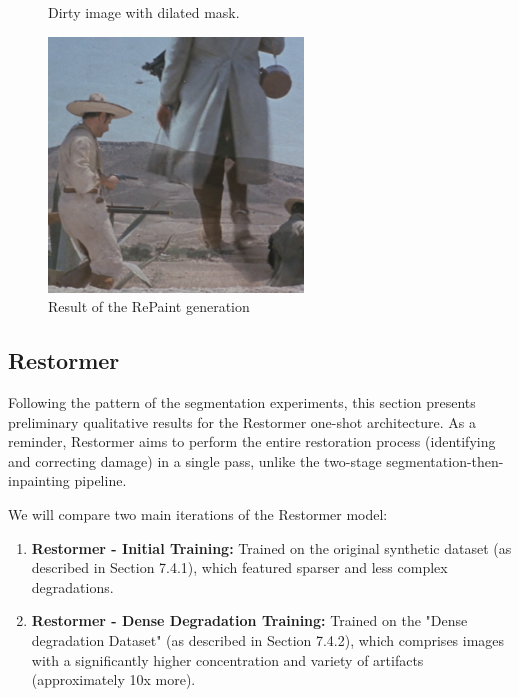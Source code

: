 \documentclass[openany, 12pt]{article}
\begin{document}
{\begin{figure}[htbp]
\begin{minipage}{0.45\textwidth}
		\caption{\smaller Dirty image with dilated mask.}
	\end{minipage}
	\hspace{0.05\textwidth}
	\begin{minipage}{0.45\textwidth}
		\centering
		\includegraphics[width=\textwidth]{images/inpainted_4.png}
		\caption{Result of the RePaint generation}
	\end{minipage}
\end{figure}
}
\subsection{Restormer}
Following the pattern of the segmentation experiments, this section presents preliminary qualitative results for the Restormer one-shot architecture. As a reminder, Restormer aims to perform the entire restoration process (identifying and correcting damage) in a single pass, unlike the two-stage segmentation-then-inpainting pipeline.

We will compare two main iterations of the Restormer model:
\begin{enumerate}
    \item \textbf{Restormer - Initial Training:} Trained on the original synthetic dataset (as described in Section 7.4.1), which featured sparser and less complex degradations.
    \item \textbf{ Restormer - Dense Degradation Training: }   Trained on the "Dense degradation Dataset" (as described in Section 7.4.2), which comprises images with a significantly higher concentration and variety of artifacts (approximately 10x more).
\end{enumerate}
\end{document}

